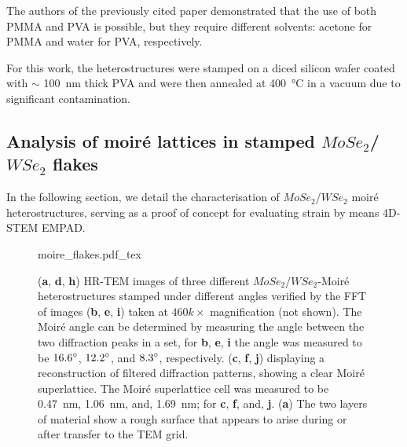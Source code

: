 The authors of the previously cited paper demonstrated that the use of both PMMA and PVA is possible, but they require different solvents: acetone for PMMA and water for PVA, respectively.

For this work, the heterostructures were stamped on a diced silicon wafer coated with \(\sim \) \SI{100}{\nm} thick PVA and were then annealed at \SI{400}{\degreeCelsius} in a vacuum due to significant contamination.


\subsection{Analysis of moiré lattices in stamped $MoSe_2$/$WSe_2$ flakes}
\label{sec:results}



In the following section, we detail the characterisation of $MoSe_2$/$WSe_2$ moiré heterostructures, serving as a proof of concept for evaluating strain by means 4D-STEM EMPAD.

\begin{figure}[p]
    \centering
    \def\svgwidth{.9\linewidth}
    {moire_flakes.pdf_tex}
    \caption{(\textbf{a}, \textbf{d}, \textbf{h}) HR-TEM images of three different $MoSe_2$/$WSe_2$-Moiré heterostructures stamped under different angles verified by the FFT of images (\textbf{b}, \textbf{e}, \textbf{i}) taken at $460k\times$ magnification (not shown). The Moiré angle can be determined by measuring the angle between the two diffraction peaks in a set, for \textbf{b}, \textbf{e}, \textbf{i} the angle was measured to be $16.6\degree$, $12.2\degree$, and $8.3\degree$, respectively. (\textbf{c}, \textbf{f}, \textbf{j}) displaying a reconstruction of filtered diffraction patterns, showing a clear Moiré superlattice. The Moiré superlattice cell was measured to be \SI{0.47}{nm}, \SI{1.06}{nm}, and, \SI{1.69}{nm}; for \textbf{c}, \textbf{f}, and, \textbf{j}. (\textbf{a}) The two layers of material show a rough surface that appears to arise during or after transfer to the TEM grid.}
    \label{fig:moire_overview}
\end{figure}


